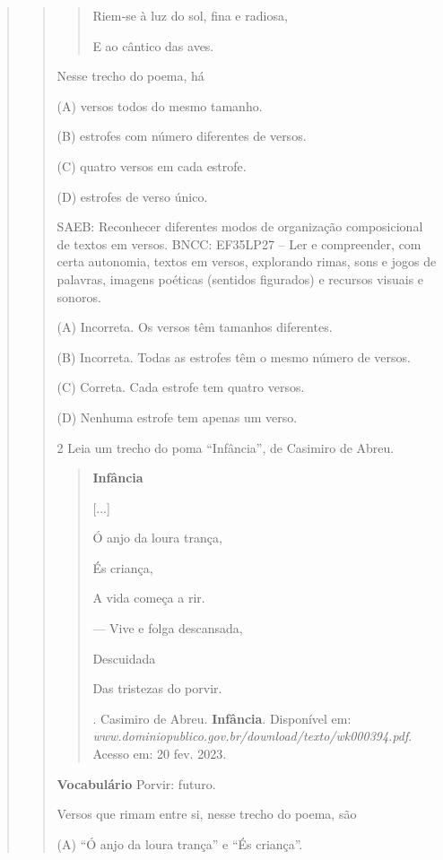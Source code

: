 \begin{quote}
\begin{quote}
\begin{quote}
Riem‑se à luz do sol, fina e radiosa,

E ao cântico das aves.

\end{quote}

Nesse trecho do poema, há

(A) versos todos do mesmo tamanho.

(B) estrofes com número diferentes de versos.

(C) quatro versos em cada estrofe.

(D) estrofes de verso único.

SAEB: Reconhecer diferentes modos de organização composicional de textos em versos.
BNCC: EF35LP27 -- Ler e compreender, com certa autonomia, textos em
versos, explorando rimas, sons e jogos de palavras, imagens poéticas
(sentidos figurados) e recursos visuais e sonoros.

(A) Incorreta. Os versos têm tamanhos diferentes.

(B) Incorreta. Todas as estrofes têm o mesmo número de versos.

(C) Correta. Cada estrofe tem quatro versos.

(D) Nenhuma estrofe tem apenas um verso.

\num{2} Leia um trecho do poma ``Infância'', de Casimiro de Abreu.

\begin{quote}
\textbf{Infância}

{[}...{]}

Ó anjo da loura trança,

És criança,

A vida começa a rir.

--- Vive e folga descansada,

Descuidada

Das tristezas do porvir.

\fonte. Casimiro de Abreu. \textbf{Infância}. Disponível em:
\emph{www.dominiopublico.gov.br/download/texto/wk000394.pdf}. Acesso em: 20
fev. 2023.
\end{quote}

\textbf{Vocabulário}
Porvir: futuro.

Versos que rimam entre si, nesse trecho do poema, são

(A) ``Ó anjo da loura trança'' e ``És criança''.


\end{quote}
\end{quote}
